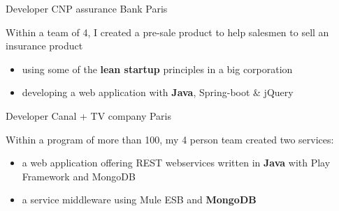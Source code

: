 \documentclass[11pt,a4paper]{moderncv}
\begin{document}
{Developer}
{CNP assurance}
{Bank}
{Paris}
{
Within a team of 4, I created a pre-sale product to help salesmen to sell an insurance product
\begin{itemize}
\item using some of the \textbf{lean startup} principles in a big corporation
\item developing a web application with \textbf{Java}, Spring-boot \& jQuery
\end{itemize}
\vspace{5mm}
}

{Developer}
{Canal + }
{TV company}
{Paris}
{
Within a program of more than 100, my 4 person team created two services:
\begin{itemize}
\item a web application offering REST webservices written in \textbf{Java} with Play Framework and MongoDB
\item a service middleware using Mule ESB and \textbf{MongoDB}
\end{itemize}
}
\end{document}
